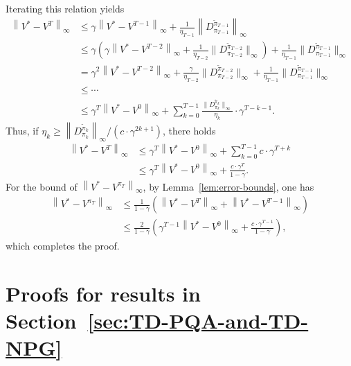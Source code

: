 \documentclass[10pt]{article}
\newcommand{\ls}{\left}
\newcommand{\rs}{\right}
\theoremstyle{plain}
\theoremstyle{definition}
\begin{document}
Iterating this relation yields
\begin{align*}
    \ls\| V^* - V^{T} \rs\|_\infty &\leq \gamma \ls\| V^* - V^{T-1} \rs\|_\infty + \frac{1}{\eta_{T-1}} \ls\| D_{\pi_{T-1}}^{\tilde{\pi}_{T-1}} \rs\|_\infty \\
    &\leq \gamma \ls( \gamma \ls\| V^* - V^{T-2} \rs\|_\infty + \frac{1}{\eta_{T-2}} \| D_{\pi_{T-2}}^{\tilde{\pi}_{T-2}} \|_\infty \rs) + \frac{1}{\eta_{T-1}} \| D_{\pi_{T-1}}^{\tilde{\pi}_{T-1}} \|_\infty \\
    &= \gamma^2 \ls\| V^* - V^{T-2} \rs\|_\infty + \frac{\gamma}{\eta_{T-2}} \| D_{\pi_{T-2}}^{\tilde{\pi}_{T-2}} \|_\infty + \frac{1}{\eta_{T-1}} \| D_{\pi_{T-1}}^{\tilde{\pi}_{T-1}} \|_\infty \\
    &\leq \cdots \\
    &\leq \gamma^T \ls\| V^* - V^0 \rs\|_\infty + \sum_{k=0}^{T-1} \frac{\| D_{\pi_k}^{\tilde{\pi}_k} \|_\infty}{\eta_k} \cdot \gamma ^{T-k-1}.
\end{align*}
Thus, if $\eta_k \geq {\ls\| D_{\pi_k}^{\tilde{\pi}_k} \rs\|_\infty}\big/{(c \cdot \gamma^{2k+1})}$, there holds
\begin{align*}
    \ls\| V^* - V^{T} \rs\|_\infty &\leq \gamma^T \ls\| V^* - V^0 \rs\|_\infty + \sum_{k=0}^{T-1} c\cdot \gamma^{T+k} \\
    &\leq \gamma^T \ls\| V^* - V^0 \rs\|_\infty + \frac{c \cdot \gamma^T}{1-\gamma}.
\end{align*}
For the bound of $\ls\| V^* - V^{\pi_T} \rs\|_\infty$, by Lemma~\ref{lem:error-bounds}, one has 
\begin{align*}
    \ls\| V^* - V^{\pi_T} \rs\|_\infty &\leq \frac{1}{1-\gamma} \ls( \ls\| V^* - V^T \rs\|_\infty + \ls\| V^* - V^{T-1} \rs\|_\infty \rs) \\
    &\leq \frac{2}{1-\gamma} \ls(  \gamma^{T-1} \ls\| V^* - V^0 \rs\|_\infty + \frac{c \cdot \gamma^{T-1}}{1-\gamma}\rs),
\end{align*}
which completes the proof.

\section{Proofs for results in Section~\ref{sec:TD-PQA-and-TD-NPG}}
\end{document}
